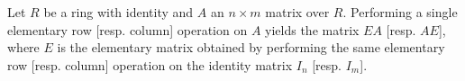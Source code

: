 Let $R$ be a ring with identity and $A$ an $n \times m$ matrix over $R$. Performing a single elementary row [resp. column] operation on $A$ yields the matrix $EA$ [resp. $AE$], where $E$ is the elementary matrix obtained by performing the same elementary row [resp. column] operation on the identity matrix $I_n$ [resp. $I_m$].
